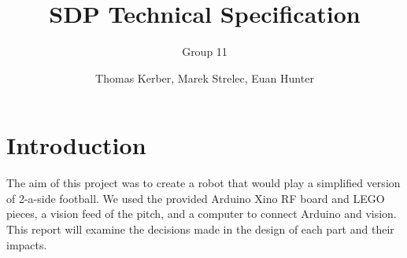 \documentclass[a4paper,12pt]{scrartcl}
\author{Thomas Kerber, Marek Strelec, Euan Hunter}
\title{SDP Technical Specification}
\subtitle{Group 11}
\begin{document}
\maketitle

\section{Introduction}

The aim of this project was to create a robot that would play a simplified
version of 2-a-side football. We used the provided Arduino Xino RF board and
LEGO pieces, a vision feed of the pitch, and a computer to connect Arduino and
vision. This report will examine the decisions made in the design of each part
and their impacts.







\pagebreak


\pagebreak
\appendix





\end{document}
